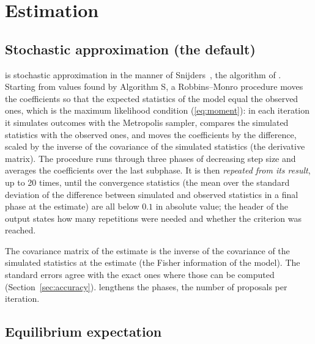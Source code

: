 \chapter{Estimation}\label{ch:estimation}

\section{Stochastic approximation (the default)}\label{sec:sa}

 is stochastic approximation in the manner of Snijders~\cite{snijders2002}, the algorithm of \mpnet{}. Starting from values found by Algorithm S, a Robbins--Monro procedure moves the coefficients so that the expected statistics of the model equal the observed ones, which is the maximum likelihood condition (\ref{eq:moment}): in each iteration it simulates outcomes with the Metropolis sampler, compares the simulated statistics with the observed ones, and moves the coefficients by the difference, scaled by the inverse of the covariance of the simulated statistics (the derivative matrix). The procedure runs through three phases of decreasing step size and averages the coefficients over the last subphase. It is then \emph{repeated from its result}, up to 20 times, until the convergence statistics (the mean over the standard deviation of the difference between simulated and observed statistics in a final phase at the estimate) are all below $0.1$ in absolute value; the header of the output states how many repetitions were needed and whether the criterion was reached.

The covariance matrix of the estimate is the inverse of the covariance of the simulated statistics at the estimate (the Fisher information of the model). The standard errors agree with the exact ones where those can be computed (Section~\ref{sec:accuracy}).  lengthens the phases,  the number of proposals per iteration.

\section{Equilibrium expectation}\label{sec:ee}

